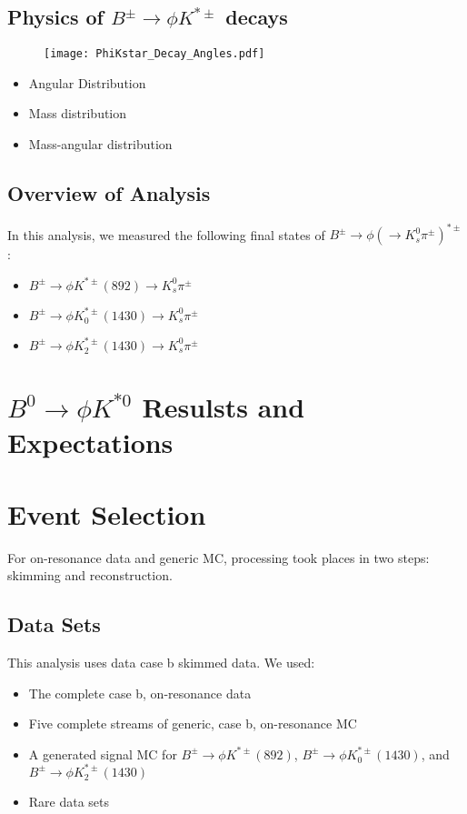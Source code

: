 \documentclass[11pt]{article}
\begin{document}
\subsection{Physics of $B^\pm\to\phi K^{*\pm}$ decays}
\begin{figure}[!h]
  \centering
  \texttt{[image: PhiKstar\_Decay\_Angles.pdf]}
\end{figure} 

\begin{itemize}
\item Angular Distribution
\item Mass distribution
\item Mass-angular distribution
\end{itemize}
                

\subsection{Overview of Analysis}
In this analysis, we measured the following final states of $B^{\pm}
\rightarrow \phi (\rightarrow K^{0}_{s} \pi^{\pm})^{* \pm} $:

\begin{itemize}
\item $B^{\pm} \rightarrow \phi K^{* \pm}(892) \rightarrow K^{0}_{s} \pi^{\pm}$ 
\item $B^{\pm} \rightarrow \phi K^{* \pm}_{0}(1430) \rightarrow K^{0}_{s} \pi^{\pm}$ 
\item $B^{\pm} \rightarrow \phi K^{* \pm}_{2}(1430) \rightarrow K^{0}_{s} \pi^{\pm}$ 
\end{itemize}


\section{$B^{0} \rightarrow \phi K^{* 0}$ Resulsts and Expectations}

\section{Event Selection}

For on-resonance data and generic MC, processing took places in two
steps: skimming and reconstruction.

\subsection{Data Sets}

This analysis uses data case b skimmed data. We used:
\begin{itemize}
\item The complete case b, on-resonance data
\item Five complete streams of generic, case b, on-resonance MC
\item A generated signal MC for $B^{\pm} \rightarrow \phi K^{* \pm}(892)$,
  $B^{\pm} \rightarrow \phi K^{* \pm}_{0}(1430)$, 
    and $ B^{\pm} \rightarrow \phi K^{* \pm}_{2}(1430)$    
\item Rare data sets
\end{itemize}
\end{document}
